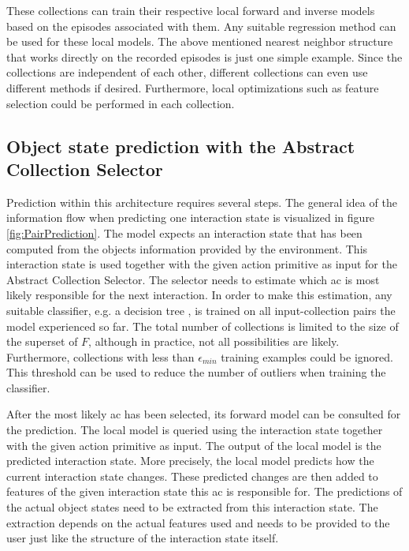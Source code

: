 These collections can train their respective local forward and inverse models based on the episodes associated with them. Any suitable regression method can be used for these local models. The above mentioned nearest neighbor structure that works directly on the recorded episodes is just one simple example. Since the collections are independent of each other, different collections can even use different methods if desired. Furthermore, local optimizations such as feature selection could be performed in each collection. %

\subsection{Object state prediction with the Abstract Collection Selector \label{sec:pairPrediction}}

Prediction within this architecture requires several steps. The general idea of the information flow when predicting one interaction state is visualized in figure \ref{fig:PairPrediction}. The model expects an interaction state that has been computed from the objects information provided by the environment. This interaction state is used together with the given action primitive as input for the Abstract Collection Selector. The selector needs to estimate which \gls{ac} is most likely responsible for the next interaction. In order to make this estimation, any suitable classifier, e.g. a decision tree \cite{decisionTree}, is trained on all input-collection pairs the model experienced so far. 
The total number of collections is limited to the size of the superset of $F$, although in practice, not all possibilities are likely. Furthermore, collections with less than $\epsilon_{min}$ training examples could be ignored. This threshold can be used to reduce the number of outliers when training the classifier. 

After the most likely \gls{ac} has been selected, its forward model can be consulted for the prediction. The local model is queried using the interaction state together with the given action primitive as input. The output of the local model is the predicted interaction state. 
More precisely, the local model predicts how the current interaction state changes. These predicted changes are then added to features of the given interaction state this \gls{ac} is responsible for.
The predictions of the actual object states need to be extracted from this interaction state. The extraction depends on the actual features used and needs to be provided to the user just like the structure of the interaction state itself.

